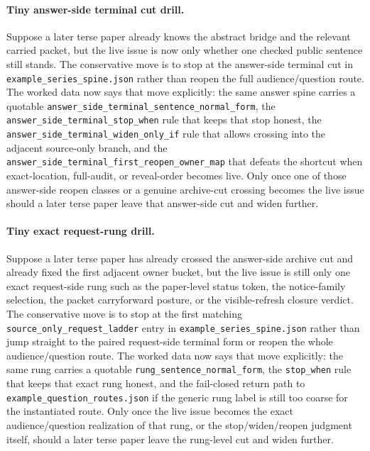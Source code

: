 \documentclass[11pt]{article}
\begin{document}
\paragraph{Tiny answer-side terminal cut drill.}
Suppose a later terse paper already knows the abstract bridge and the relevant carried packet, but the live issue is now only whether one checked public sentence still stands. The conservative move is to stop at the answer-side terminal cut in \nolinkurl{example\_series\_spine.json} rather than reopen the full audience/question route. The worked data now says that move explicitly: the same answer spine carries a quotable \texttt{answer\_side\_terminal\_sentence\_normal\_form}, the \texttt{answer\_side\_terminal\_stop\_when} rule that keeps that stop honest, the \texttt{answer\_side\_terminal\_widen\_only\_if} rule that allows crossing into the adjacent source-only branch, and the \texttt{answer\_side\_terminal\_first\_reopen\_owner\_map} that defeats the shortcut when exact-location, full-audit, or reveal-order becomes live. Only once one of those answer-side reopen classes or a genuine archive-cut crossing becomes the live issue should a later terse paper leave that answer-side cut and widen further.\cite{series:workedexample}

\paragraph{Tiny exact request-rung drill.}
Suppose a later terse paper has already crossed the answer-side archive cut and already fixed the first adjacent owner bucket, but the live issue is still only one exact request-side rung such as the paper-level status token, the notice-family selection, the packet carryforward posture, or the visible-refresh closure verdict. The conservative move is to stop at the first matching \texttt{source\_only\_request\_ladder} entry in \nolinkurl{example\_series\_spine.json} rather than jump straight to the paired request-side terminal form or reopen the whole audience/question route. The worked data now says that move explicitly: the same rung carries a quotable \texttt{rung\_sentence\_normal\_form}, the \texttt{stop\_when} rule that keeps that exact rung honest, and the fail-closed return path to \texttt{example\_question\_routes.json} if the generic rung label is still too coarse for the instantiated route. Only once the live issue becomes the exact audience/question realization of that rung, or the stop/widen/reopen judgment itself, should a later terse paper leave the rung-level cut and widen further.\cite{series:workedexample}
\end{document}
